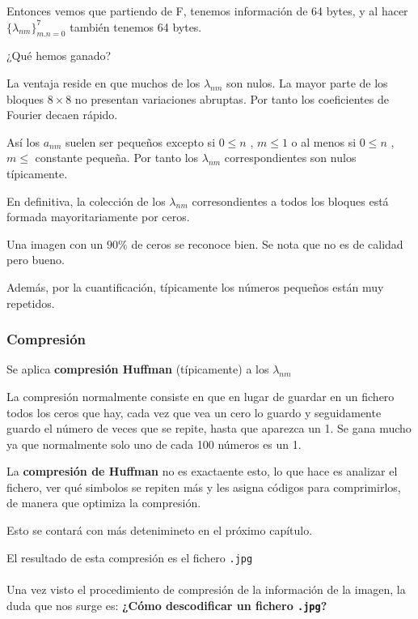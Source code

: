 			Entonces vemos que partiendo de F, tenemos información de 64 bytes, y al hacer $\{\lambda_{nm}\}^7_{m.n=0}$ también tenemos 64 bytes.

			¿Qué hemos ganado?

			La ventaja reside en que muchos de los $\lambda_{nm}$ son nulos.
			La mayor parte de los bloques $8\times 8$ no presentan variaciones abruptas. Por tanto los coeficientes de Fourier decaen rápido.

			Así los $a_{nm}$ suelen ser pequeños excepto si $0 \leq n$ , $m \leq 1$ o al menos si $0 \leq n$ , $m \leq$ constante pequeña. Por tanto los $\lambda_{nm}$ correspondientes son nulos típicamente.

			En definitiva, la colección de los $\lambda_{nm}$ corresondientes a todos los bloques está formada mayoritariamente por ceros.

			\begin{example}
				Una imagen con un  $90\%$ de ceros se reconoce bien. Se nota que no es de calidad pero bueno.
			\end{example}

			Además, por la cuantificación, típicamente los números pequeños están muy repetidos.

		\subsubsection{Compresión}
			Se aplica \textbf{compresión Huffman} (típicamente) a los $\lambda_{nm}$

			La compresión normalmente consiste en que en lugar de guardar en un fichero todos los ceros que hay, cada vez que vea un cero lo guardo y seguidamente guardo el número de veces que se repite, hasta que aparezca un 1. Se gana mucho ya que normalmente solo uno de cada 100 números es un 1.

			\obs La \textbf{compresión de Huffman} no es exactaente esto, lo que hace es analizar el fichero, ver qué simbolos se repiten más y les asigna códigos para comprimirlos, de manera que optimiza la compresión.

			Esto se contará con más detenimineto en el próximo capítulo.


			El resultado de esta compresión es el fichero \texttt{.jpg}\\\\


			Una vez visto el procedimiento de compresión de la información de la imagen, la duda que nos surge es: \textbf{¿Cómo descodificar un  fichero \texttt{.jpg}?}

